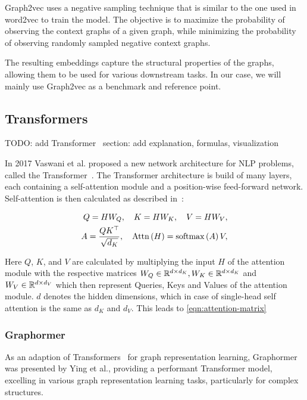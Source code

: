 Graph2vec uses a negative sampling technique that is similar to the one used in word2vec to train the model. The objective is to maximize the probability of observing the context graphs of a given graph, while minimizing the probability of observing randomly sampled negative context graphs.

The resulting embeddings capture the structural properties of the graphs, allowing them to be used for various downstream tasks. In our case, we will mainly use Graph2vec as a benchmark and reference point.

\subsection{Transformers}
TODO: add Transformer~\cite{vaswani2017attention} section: add explanation, formulas, visualization

In 2017 Vaswani et al. proposed a new network architecture for NLP problems, called the Transformer~\cite{vaswani2017attention}. The Transformer architecture is build of many layers, each containing a self-attention module and a position-wise feed-forward network. Self-attention is then calculated as described in~\cite{2021graphormer}:

\begin{align}
    Q = HW_Q,\quad K = HW_K,\quad V = HW_V,\label{eqn:attention-alpha}\\
    A = \frac{QK^\top}{\sqrt{d_K}}, \quad \mathrm{Attn}\left(H\right) = \mathrm{softmax}\left(A\right)V,\label{eqn:attention-alpha2}
\end{align}

Here $Q$, $K$, and $V$ are calculated by multiplying the input $H$ of the attention module with the respective matrices $W_Q\in\mathbb{R}^{d\times d_K}, W_K\in\mathbb{R}^{d\times d_K}$ and $ W_V\in\mathbb{R}^{d\times d_V}$ which then represent Queries, Keys and Values of the attention module. $d$ denotes the hidden dimensions, which in case of single-head self attention is the same as $d_K$ and $d_V$. This leads to \autoref{eqn:attention-matrix}

\subsubsection{Graphormer}
As an adaption of Transformers~\cite{vaswani2017attention} for graph representation learning, Graphormer~\cite{2021graphormer} was presented by Ying et al., providing a performant Transformer model, excelling in various graph representation learning tasks, particularly for complex structures.

